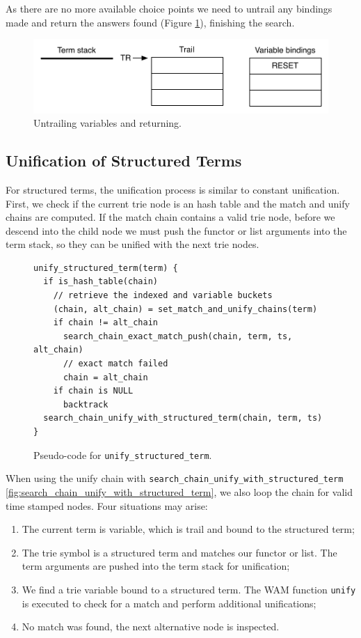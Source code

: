 As there are no more available choice points we need to untrail any bindings made and return
the answers found (Figure \ref{fig:collect_ex6}), finishing the search.

\begin{figure}[H]
  \centering
    \includegraphics[scale=0.6]{collect_ex6.pdf}
  \caption{Untrailing variables and returning.}
  \label{fig:collect_ex6}
\end{figure}

\subsection{Unification of Structured Terms}

For structured terms, the unification process is similar to constant unification.
First, we check if the current
trie node is an hash table and the match and unify chains are computed.
If the match chain contains a valid trie node, before we descend into the child
node we must push the functor or list arguments into the term stack, so they can
be unified with the next trie nodes.

\begin{figure}[ht]
\begin{Verbatim}
unify_structured_term(term) {
  if is_hash_table(chain)
    // retrieve the indexed and variable buckets
    (chain, alt_chain) = set_match_and_unify_chains(term)
    if chain != alt_chain
      search_chain_exact_match_push(chain, term, ts, alt_chain)
      // exact match failed
      chain = alt_chain
    if chain is NULL
      backtrack
  search_chain_unify_with_structured_term(chain, term, ts)
}
\end{Verbatim}
\caption{Pseudo-code for \texttt{unify\_structured\_term}.}
\label{fig:unify_structured_term}
\end{figure}

When using the unify chain with \texttt{search\_chain\_unify\_with\_structured\_term}
\ref{fig:search_chain_unify_with_structured_term},
we also loop the chain for valid time stamped nodes.
Four situations may arise:

\begin{enumerate}
  \item The current term is variable, which is trail and bound to the structured term;
  \item The trie symbol is a structured term and matches our functor or list.
  The term arguments are pushed into the term stack for unification;
  \item We find a trie variable bound to a structured term. The WAM function \texttt{unify} is executed to check for a match and perform additional unifications;
  \item No match was found, the next alternative node is inspected.
\end{enumerate}

